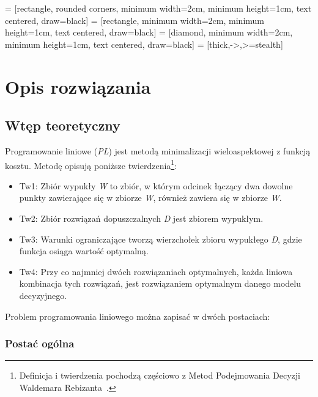 \usetikzlibrary{shapes, arrows}
\usetikzlibrary{positioning}
\usetikzlibrary{shapes.geometric, arrows, positioning}
\usetikzlibrary{intersections, patterns, calc}

 = [rectangle, rounded corners, minimum width=2cm, minimum height=1cm, text centered, draw=black]
 = [rectangle, minimum width=2cm, minimum height=1cm, text centered, draw=black]
 = [diamond, minimum width=2cm, minimum height=1cm, text centered, draw=black]
 = [thick,->,>=stealth]

\chapter{Opis rozwiązania}\label{ch:generation}

\section{Wtęp teoretyczny}

Programowanie liniowe (\textit{PL}) jest metodą minimalizacji wieloaspektowej z funkcją kosztu. Metodę opisują poniższe twierdzenia\footnote{Definicja i twierdzenia pochodzą częściowo z Metod Podejmowania Decyzji Waldemara Rebizanta~\cite{rebizant2012metody}.}:
\begin{itemize}
\item Tw1: Zbiór wypukły \textit{W} to zbiór, w którym odcinek łączący dwa dowolne punkty zawierające się w zbiorze \textit{W}, również zawiera się w zbiorze \textit{W}.

\item Tw2: Zbiór rozwiązań dopuszczalnych \textit{D} jest zbiorem wypukłym.

\item Tw3: Warunki ograniczające tworzą wierzchołek zbioru wypukłego \textit{D}, gdzie funkcja osiąga wartość optymalną.

\item Tw4: Przy co najmniej dwóch rozwiązaniach optymalnych, każda liniowa kombinacja tych rozwiązań, jest rozwiązaniem optymalnym danego modelu decyzyjnego.
\end{itemize}
Problem programowania liniowego można zapisać w dwóch postaciach:

\subsection{Postać ogólna}
    
